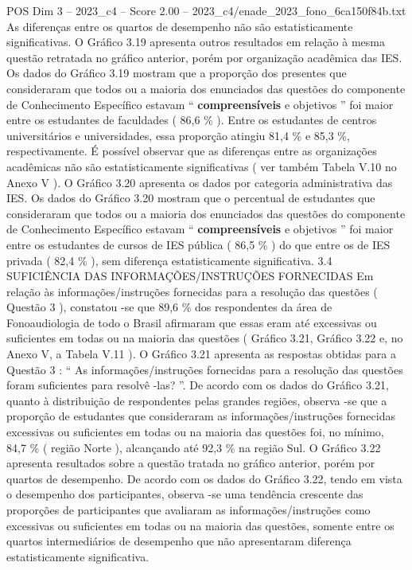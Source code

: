 \begin{textsample}{POS Dim 3 – 2023\_c4 – Score 2.00 – 2023\_c4/enade\_2023\_fono\_6ca150f84b.txt}
As diferenças entre os quartos de desempenho não são estatisticamente significativas.
O Gráfico 3.19 apresenta outros resultados em relação à mesma questão retratada no gráfico anterior, porém por organização acadêmica das IES.
Os dados do Gráfico 3.19 mostram que a proporção dos presentes que consideraram que todos ou a maioria dos enunciados das questões do componente de Conhecimento Específico estavam “ \textbf{compreensíveis} e objetivos ” foi maior entre os estudantes de faculdades ( 86,6 \% ).
Entre os estudantes de centros universitários e universidades, essa proporção atingiu 81,4 \% e 85,3 \%, respectivamente.
É possível observar que as diferenças entre as organizações acadêmicas não são estatisticamente significativas ( ver também Tabela V.10 no Anexo V ).
O Gráfico 3.20 apresenta os dados por categoria administrativa das IES.
Os dados do Gráfico 3.20 mostram que o percentual de estudantes que consideraram que todos ou a maioria dos enunciados das questões do componente de Conhecimento Específico estavam “ \textbf{compreensíveis} e objetivos ” foi maior entre os estudantes de cursos de IES pública ( 86,5 \% ) do que entre os de IES privada ( 82,4 \% ), sem diferença estatisticamente significativa. 3.4 SUFICIÊNCIA DAS INFORMAÇÕES/INSTRUÇÕES FORNECIDAS Em relação às informações/instruções fornecidas para a resolução das questões ( Questão 3 ), constatou -se que 89,6 \% dos respondentes da área de Fonoaudiologia de todo o Brasil afirmaram que essas eram até excessivas ou suficientes em todas ou na maioria das questões ( Gráfico 3.21, Gráfico 3.22 e, no Anexo V, a Tabela V.11 ).
O Gráfico 3.21 apresenta as respostas obtidas para a Questão 3 : “ As informações/instruções fornecidas para a resolução das questões foram suficientes para resolvê -las? ”.
De acordo com os dados do Gráfico 3.21, quanto à distribuição de respondentes pelas grandes regiões, observa -se que a proporção de estudantes que consideraram as informações/instruções fornecidas excessivas ou suficientes em todas ou na maioria das questões foi, no mínimo, 84,7 \% ( região Norte ), alcançando até 92,3 \% na região Sul.
O Gráfico 3.22 apresenta resultados sobre a questão tratada no gráfico anterior, porém por quartos de desempenho.
De acordo com os dados do Gráfico 3.22, tendo em vista o desempenho dos participantes, observa -se uma tendência crescente das proporções de participantes que avaliaram as informações/instruções como excessivas ou suficientes em todas ou na maioria das questões, somente entre os quartos intermediários de desempenho que não apresentaram diferença estatisticamente significativa.

\end{textsample}
